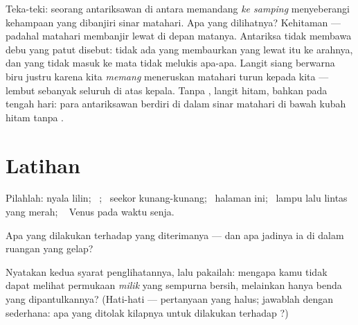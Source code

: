 \begin{remark}\label{rem:g7:light-sources-propagation:space}
Teka-teki: seorang antariksawan di antara  memandang \emph{ke
samping} menyeberangi kehampaan yang dibanjiri sinar matahari. Apa
yang dilihatnya? Kehitaman --- padahal  matahari membanjir lewat
di depan matanya. Antariksa tidak membawa debu yang patut disebut:
tidak ada yang membaurkan  yang lewat itu ke arahnya, dan 
yang tidak masuk ke mata tidak melukis apa-apa. Langit siang berwarna
biru justru karena  kita \emph{memang} meneruskan  matahari
turun kepada kita ---  lembut sebanyak seluruh  di atas
kepala. Tanpa , langit hitam, bahkan pada tengah hari: para
antariksawan  berdiri di dalam sinar matahari di bawah kubah
hitam tanpa .
\end{remark}

\section{Latihan}

\begin{exercise}[$\star$]\label{exo:g7:light-sources-propagation:1}
Pilahlah: nyala lilin; \ ; \ seekor kunang-kunang; \ halaman ini;
\ lampu lalu lintas yang merah; \  Venus pada waktu senja.
\end{exercise}

\begin{exercise}[$\star$]\label{exo:g7:light-sources-propagation:2}
Apa yang dilakukan  terhadap  yang diterimanya ---
dan apa jadinya ia di dalam ruangan yang gelap?
\end{exercise}

\begin{exercise}[$\star$]\label{exo:g7:light-sources-propagation:3}
Nyatakan kedua syarat penglihatannya, lalu pakailah: mengapa kamu
tidak dapat melihat permukaan \emph{milik}  yang sempurna
bersih, melainkan hanya benda yang dipantulkannya? (Hati-hati ---
pertanyaan yang halus; jawablah dengan sederhana: apa yang ditolak
kilapnya untuk dilakukan terhadap ?)
\end{exercise}

